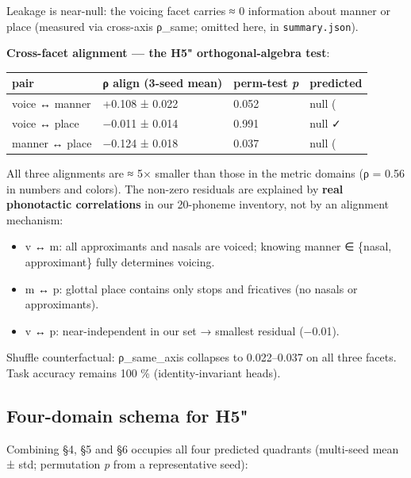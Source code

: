 Leakage is near-null: the voicing facet carries ≈ 0 information
about manner or place (measured via cross-axis ρ\_same; omitted here,
in \texttt{summary.json}).

\textbf{Cross-facet alignment --- the H5" orthogonal-algebra test}:

\begin{longtable}[]{@{}llll@{}}
\toprule
pair & ρ align (3-seed mean) & perm-test \emph{p} & predicted\tabularnewline
\midrule
\endhead
voice ↔ manner & +0.108 ± 0.022 & 0.052 & null (\tabularnewline
voice ↔ place & −0.011 ± 0.014 & 0.991 & null ✓\tabularnewline
manner ↔ place & −0.124 ± 0.018 & 0.037 & null (\tabularnewline
\bottomrule
\end{longtable}

All three alignments are ≈ 5× smaller than those in the metric
domains (ρ = 0.56 in numbers and colors). The non-zero residuals are
explained by \textbf{real phonotactic correlations} in our 20-phoneme
inventory, not by an alignment mechanism:

\begin{itemize}
\tightlist
\item
  v ↔ m: all approximants and nasals are voiced; knowing manner ∈
  \{nasal, approximant\} fully determines voicing.
\item
  m ↔ p: glottal place contains only stops and fricatives (no nasals
  or approximants).
\item
  v ↔ p: near-independent in our set → smallest residual (−0.01).
\end{itemize}

Shuffle counterfactual: \textbar ρ\_same\_axis\textbar{} collapses to 0.022--0.037 on
all three facets. Task accuracy remains 100 \% (identity-invariant
heads).

\subsection{Four-domain schema for H5"}

Combining §4, §5 and §6 occupies all four predicted quadrants
(multi-seed mean ± std; permutation \emph{p} from a representative seed):

